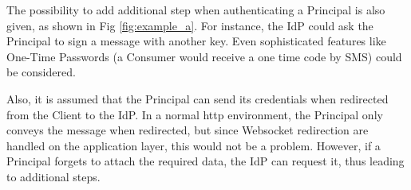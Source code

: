 The possibility to add additional step when authenticating a Principal is also given, as shown in Fig \ref{fig:example_a}. For instance, the IdP could ask the Principal to sign a message with another key. Even sophisticated features like One-Time Passwords (a Consumer would receive a one time code by SMS) could be considered. 

Also, it is assumed that the Principal can send its credentials when redirected from the Client to the IdP. In a normal http environment, the Principal only conveys the message when redirected, but since Websocket redirection are handled on the application layer, this would not be a problem. However, if a Principal forgets to attach the required data, the IdP can request it, thus leading to additional steps.


